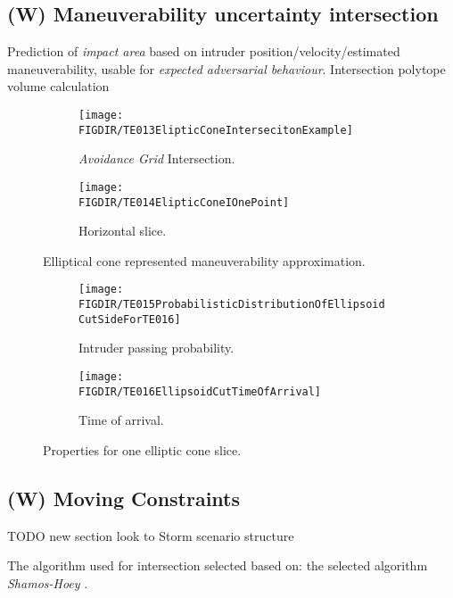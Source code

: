\subsection{(W) Maneuverability uncertainty intersection}\label{s:uncertaintyIntersection}
    \noindent Prediction of \emph{impact area} based on intruder position/velocity/estimated maneuverability, usable for \emph{expected adversarial behaviour}. Intersection polytope volume calculation \cite{lawrence1991polytope}
    
    \begin{figure}[H]
    	\centering
        \begin{subfigure}{0.48\textwidth}
            \texttt{[image: \\FIGDIR/TE013ElipticConeIntersecitonExample]}
            \caption{\emph{Avoidance Grid} Intersection.}
            \label{fig:ellipticConeIntersectionExample}
        \end{subfigure}
        \begin{subfigure}{0.48\textwidth}
            \texttt{[image: \\FIGDIR/TE014ElipticConeIOnePoint]} 
            \caption{Horizontal slice.}
            \label{fig:ellipticalConeHorizontalSlice}
        \end{subfigure}
        \caption{Elliptical cone represented maneuverability approximation. }
        \label{fig:ellipticalConeRepresentedManuevurabilityApproximation}
    \end{figure}
    
    \begin{figure}[H]
    	\centering
        \begin{subfigure}{0.48\textwidth}
            \texttt{[image: \\FIGDIR/TE015ProbabilisticDistributionOfEllipsoidCutSideForTE016]}
            \caption{Intruder passing probability.}
            \label{fig:intruderPassingProbability}
        \end{subfigure}
        \begin{subfigure}{0.48\textwidth}
            \texttt{[image: \\FIGDIR/TE016EllipsoidCutTimeOfArrival]} 
            \caption{Time of arrival.}
            \label{fig:intruderTimeOfArrival}
        \end{subfigure}
        \caption{Properties for one elliptic cone slice. }
        \label{fig:propertiesEllipticConeSlice}
    \end{figure}

\subsection{(W) Moving Constraints}\label{s:MovingVirtualConstraints}
TODO new section look to Storm scenario structure

The algorithm used for intersection selected based on:\citep{bentley1979algorithms} the selected algorithm  \emph{Shamos-Hoey} \cite{shamos1976geometric}.
